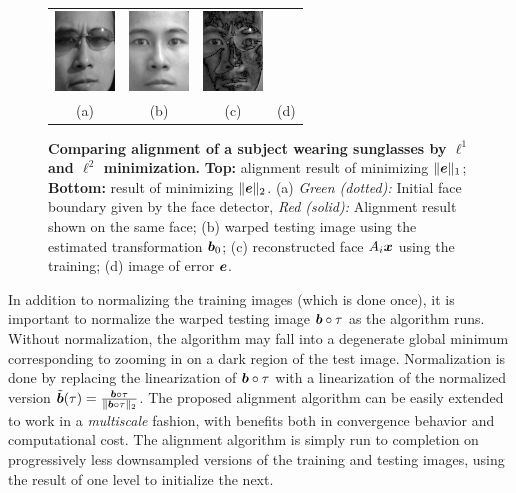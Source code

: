 \begin{figure}
{\begin{tabular}{cccc}
\includegraphics[height=\tempheight]{figures_pami/y_warp_L2} &
\includegraphics[height=\tempheight]{figures_pami/y_hat_L2} &
\includegraphics[height=\tempheight]{figures_pami/e_L2} \\
(a) & (b) & (c) & (d)
\end{tabular}}
\caption{\small{\bf Comparing alignment of a subject wearing sunglasses by
$\ell^1$ and $\ell^2$ minimization.}
{\bf Top:} alignment result of minimizing $\|\boldsymbol{e}\|_1$; {\bf Bottom:}
result of minimizing $\|\boldsymbol{e}\|_2$. (a) {\em Green (dotted):} Initial face boundary
given by the face detector, {\em Red (solid):} Alignment result shown on the same
face; (b) warped testing image using the estimated transformation $\boldsymbol{b}_0$;
(c) reconstructed face $A_i{\boldsymbol{x}}$ using the training; (d) image of error $\boldsymbol{e}$. }\label{fig:L1-L2-align}
\end{figure}

In addition to normalizing the training images (which is done
once), it is important to normalize the warped testing image
$\boldsymbol{b} \circ \tau$ as the algorithm runs.  Without normalization,
the algorithm may fall into a degenerate global minimum
corresponding to zooming in on a dark region of the test
image.  Normalization is done by replacing the linearization of
$\boldsymbol{b} \circ \tau$ with a linearization of the normalized version
$\tilde {\boldsymbol{b}}(\tau) = \frac{\boldsymbol{b} \circ \tau}{\|\boldsymbol{b} \circ \tau\|_2}$.
The proposed alignment algorithm can be easily extended to work
in a {\em multiscale} fashion, with benefits both in
convergence behavior and computational cost.  The alignment
algorithm is simply run to completion on progressively less
downsampled versions of the training and testing images, using
the result of one level to initialize the next.

